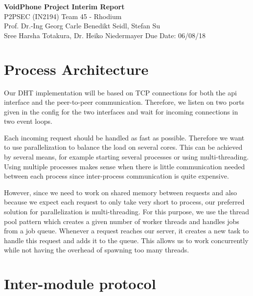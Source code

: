 \documentclass[a4paper, 11pt]{article}
\begin{document}
\noindent
\large\textbf{VoidPhone Project} \hfill \textbf{Interim Report}\\
\normalsize P2PSEC (IN2194)  \hfill Team 45 - Rhodium\\
Prof. Dr.-Ing Georg Carle \hfill Benedikt Seidl, Stefan Su\\
Sree Harsha Totakura, Dr. Heiko Niedermayer \hfill Due Date: 06/08/18

\section*{Process Architecture}

Our DHT implementation will be based on TCP connections for both the api interface and the peer-to-peer communication. Therefore, we listen on two ports given in the config for the two interfaces and wait for incoming connections in two event loops.

Each incoming request should be handled as fast as possible. Therefore we want to use parallelization to balance the load on several cores. This can be achieved by several means, for example starting several processes or using multi-threading.
Using multiple processes makes sense when there is little communication needed between each process since inter-process communication is quite expensive.

However, since we need to work on shared memory between requests and also because we expect each request to only take very short to process, our preferred solution for parallelization is multi-threading. For this purpose, we use the thread pool pattern which creates a given number of worker threads and handles jobs from a job queue. Whenever a request reaches our server, it creates a new task to handle this request and adds it to the queue. This allows us to work concurrently while not having the overhead of spawning too many threads.




\section*{Inter-module protocol}

\end{document}

